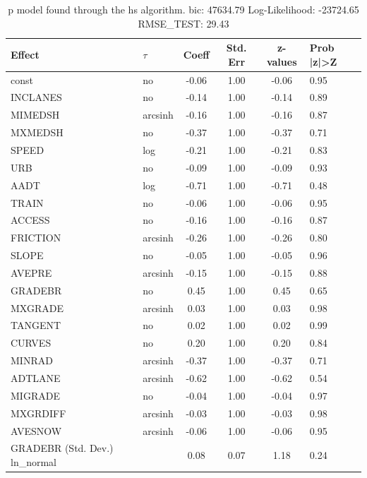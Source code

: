 \begin{table}
	\caption{p model found through the hs algorithm. bic: 47634.79 Log-Likelihood: -23724.65 RMSE_TEST: 29.43}
	\begin{center}
		\begin{tabular}{|l|l|c|c|c|l|}
			\hline
			Effect & $\tau$ & Coeff & Std. Err & z-values & Prob |z|>Z \\
			\hline
			const & no & -0.06 & 1.00 & -0.06 & 0.95 \\
			\hline
			INCLANES & no & -0.14 & 1.00 & -0.14 & 0.89 \\
			\hline
			MIMEDSH & arcsinh & -0.16 & 1.00 & -0.16 & 0.87 \\
			\hline
			MXMEDSH & no & -0.37 & 1.00 & -0.37 & 0.71 \\
			\hline
			SPEED & log & -0.21 & 1.00 & -0.21 & 0.83 \\
			\hline
			URB & no & -0.09 & 1.00 & -0.09 & 0.93 \\
			\hline
			AADT & log & -0.71 & 1.00 & -0.71 & 0.48 \\
			\hline
			TRAIN & no & -0.06 & 1.00 & -0.06 & 0.95 \\
			\hline
			ACCESS & no & -0.16 & 1.00 & -0.16 & 0.87 \\
			\hline
			FRICTION & arcsinh & -0.26 & 1.00 & -0.26 & 0.80 \\
			\hline
			SLOPE & no & -0.05 & 1.00 & -0.05 & 0.96 \\
			\hline
			AVEPRE & arcsinh & -0.15 & 1.00 & -0.15 & 0.88 \\
			\hline
			GRADEBR & no & 0.45 & 1.00 & 0.45 & 0.65 \\
			\hline
			MXGRADE & arcsinh & 0.03 & 1.00 & 0.03 & 0.98 \\
			\hline
			TANGENT & no & 0.02 & 1.00 & 0.02 & 0.99 \\
			\hline
			CURVES & no & 0.20 & 1.00 & 0.20 & 0.84 \\
			\hline
			MINRAD & arcsinh & -0.37 & 1.00 & -0.37 & 0.71 \\
			\hline
			ADTLANE & arcsinh & -0.62 & 1.00 & -0.62 & 0.54 \\
			\hline
			MIGRADE & no & -0.04 & 1.00 & -0.04 & 0.97 \\
			\hline
			MXGRDIFF & arcsinh & -0.03 & 1.00 & -0.03 & 0.98 \\
			\hline
			AVESNOW & arcsinh & -0.06 & 1.00 & -0.06 & 0.95 \\
			\hline
			GRADEBR (Std. Dev.) ln_normal &  & 0.08 & 0.07 & 1.18 & 0.24 \\

\end{tabular}
\end{center}
\end{table}
